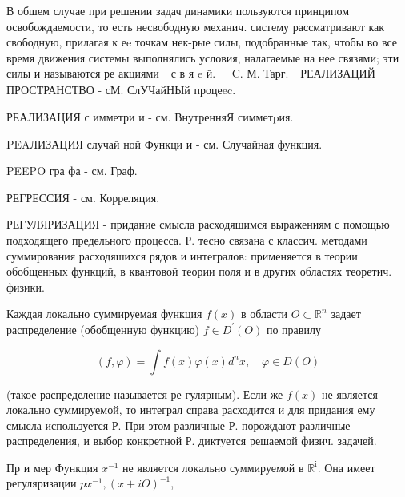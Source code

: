 \documentclass[10pt]{article}
\begin{document}
В обшем случае при решении задач динамики пользуются принципом освобождаемости, то есть несвободную механич. систему рассматривают как свободную, прилагая к еe точкам нек-рые силы, подобранные так, чтобы во все время движения системы выполнялись условия, налагаемые на нее связями; эти силы и называются ре акциями $\begin{array}{ll}\text { с в я } \mathrm{e} \text { й. } & \text { C. М. Тарг. }\end{array}$ РЕАЛИЗАЦИЙ ПРОСТРАНСТВО - сМ. СлУЧайНЫй процеec.



РЕАЛИЗАЦИЯ с имметри и - см. ВнутренняЯ симметpия.



PEAЛИЗАЦИЯ случай ной Функци и - см. Случайная функция.



PEEPO гра фа - см. Граф.



РЕГРЕССИЯ - см. Корреляция.



РЕГУЛЯРИЗАЦИЯ - придание смысла расходяшимся выражениям с помощью подходящего предельного процесса. Р. тесно связана с классич. методами суммирования расходяшихся рядов и интегралов: применяется в теории обобщенных функций, в квантовой теории поля и в других областях теоретич. физики.



Каждая локально суммируемая функция $f(x)$ в области $O \subset \mathbb{R}^{n}$ задает распределение (обобщенную функцию) $f \in D^{\prime}(O)$ по правилу



\[

(f, \varphi)=\int f(x) \varphi(x) d^{n} x, \quad \varphi \in D(O)

\]



(такое распределение называется ре гулярным). Если же $f(x)$ не является локально суммируемой, то интеграл справа расходится и для придания ему смысла используется Р. При этом различные Р. порождают различные распределения, и выбор конкретной Р. диктуется решаемой физич. задачей.



Пр и мер Функция $x^{-1}$ не является локально суммируемой в $\mathbb{R}^{\mathrm{i}}$. Она имеет регуляризации $p x^{-1},(x+i O)^{-1}$,
\end{document}
